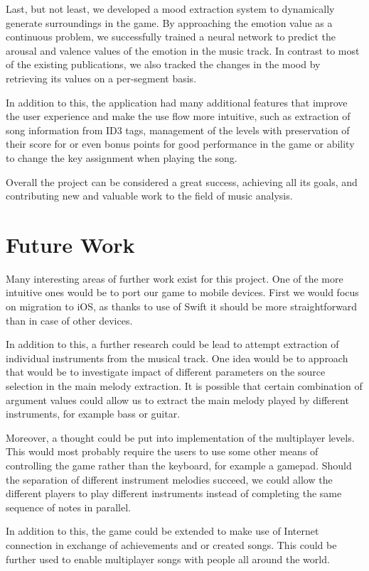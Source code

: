 Last, but not least, we developed a mood extraction system to dynamically generate surroundings in the game. By approaching the emotion value as a continuous problem, we successfully trained a neural network to predict the arousal and valence values of the emotion in the music track. In contrast to most of the existing publications, we also tracked the changes in the mood by retrieving its values on a per-segment basis.

In addition to this, the application had many additional features that improve the user experience and make the use flow more intuitive, such as extraction of song information from ID3 tags, management of the levels with preservation of their score for or even bonus points for good performance in the game or ability to change the key assignment when playing the song.

Overall the project can be considered a great success, achieving all its goals, and contributing new and valuable work to the field of music analysis.

\section{Future Work}

Many interesting areas of further work exist for this project. One of the more intuitive ones would be to port our game to mobile devices. First we would focus on migration to iOS, as thanks to use of Swift it should be more straightforward than in case of other devices. 

In addition to this, a further research could be lead to attempt extraction of individual instruments from the musical track. One idea would be to approach that would be to investigate impact of different parameters on the source selection in the main melody extraction. It is possible that certain combination of argument values could allow us to extract the main melody played by different instruments, for example bass or guitar. 

Moreover, a thought could be put into implementation of the multiplayer levels. This would most probably require the users to use some other means of controlling the game rather than the keyboard, for example a gamepad. Should the separation of different instrument melodies succeed, we could allow the different players to play different instruments instead of completing the same sequence of notes in parallel.

In addition to this, the game could be extended to make use of Internet connection in exchange of achievements and or created songs. This could be further used to enable multiplayer songs with people all around the world. 